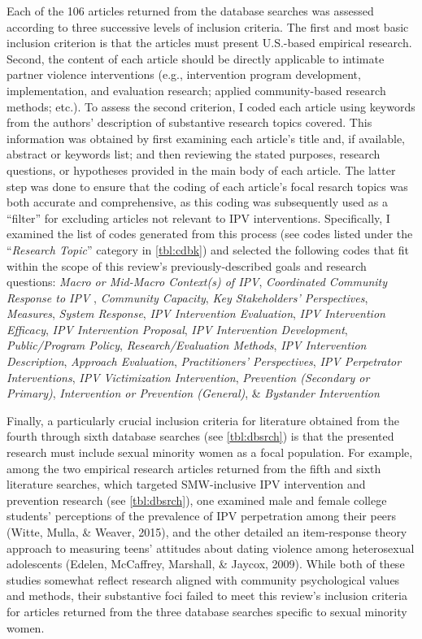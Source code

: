 \documentclass[11pt,]{tufte-book}
\begin{document}
Each of the 106 articles returned from the database searches was
assessed according to three successive levels of inclusion criteria. The
first and most basic inclusion criterion is that the articles must
present U.S.-based empirical research. Second, the content of each
article should be directly applicable to intimate partner violence
interventions (e.g., intervention program development, implementation,
and evaluation research; applied community-based research methods;
etc.). To assess the second criterion, I coded each article using
keywords from the authors' description of substantive research topics
covered. This information was obtained by first examining each article's
title and, if available, abstract or keywords list; and then reviewing
the stated purposes, research questions, or hypotheses provided in the
main body of each article. The latter step was done to ensure that the
coding of each article's focal resarch topics was both accurate and
comprehensive, as this coding was subsequently used as a ``filter'' for
excluding articles not relevant to IPV interventions. Specifically, I
examined the list of codes generated from this process (see codes listed
under the ``\emph{Research Topic}'' category in
\cref{tbl:cdbk}) and selected the following codes that
fit within the scope of this review's previously-described goals and
research questions: \emph{Macro or Mid-Macro Context(s) of IPV},
\emph{Coordinated Community Response to IPV }, \emph{Community
Capacity}, \emph{Key Stakeholders' Perspectives}, \emph{Measures},
\emph{System Response}, \emph{IPV Intervention Evaluation}, \emph{IPV
Intervention Efficacy}, \emph{IPV Intervention Proposal}, \emph{IPV
Intervention Development}, \emph{Public/Program Policy},
\emph{Research/Evaluation Methods}, \emph{IPV Intervention Description},
\emph{Approach Evaluation}, \emph{Practitioners' Perspectives},
\emph{IPV Perpetrator Interventions}, \emph{IPV Victimization
Intervention}, \emph{Prevention (Secondary or Primary)},
\emph{Intervention or Prevention (General)}, \& \emph{Bystander
Intervention}

Finally, a particularly crucial inclusion criteria for literature
obtained from the fourth through sixth database searches (see
\cref{tbl:dbsrch}) is that the presented research must
include sexual minority women as a focal population. For example, among
the two empirical research articles returned from the fifth and sixth
literature searches, which targeted SMW-inclusive IPV intervention and
prevention research (see \cref{tbl:dbsrch}), one
examined male and female college students' perceptions of the prevalence
of IPV perpetration among their peers (Witte, Mulla, \& Weaver, 2015),
and the other detailed an item-response theory approach to measuring
teens' attitudes about dating violence among heterosexual adolescents
(Edelen, McCaffrey, Marshall, \& Jaycox, 2009). While both of these
studies somewhat reflect research aligned with community psychological
values and methods, their substantive foci failed to meet this review's
inclusion criteria for articles returned from the three database
searches specific to sexual minority women.
\end{document}
